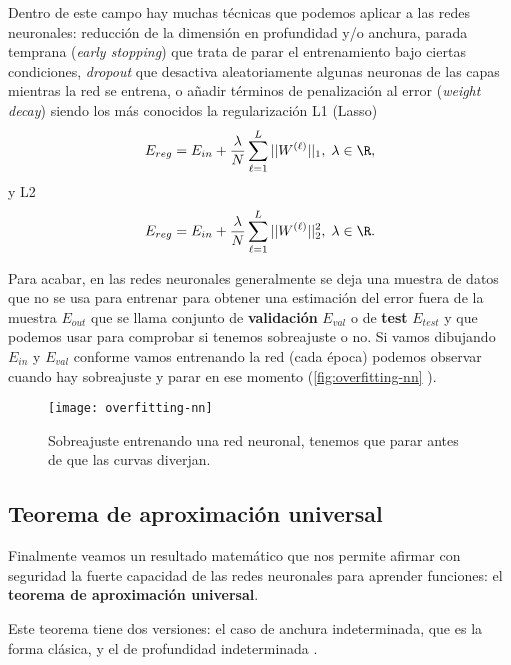 Dentro de este campo hay muchas técnicas que podemos aplicar a las redes neuronales: reducción de la dimensión en profundidad y/o anchura, parada temprana (\emph{early stopping}) que trata de parar el entrenamiento bajo ciertas condiciones, \emph{dropout} \cite{hertz2018introduction, hinton2012improving} que desactiva aleatoriamente algunas neuronas de las capas mientras la red se entrena, o añadir términos de penalización al error (\emph{weight decay}) siendo los más conocidos la regularización L1 (Lasso)
\begin{equation*}
  E_{reg} = E_{in} + \dfrac{\lambda}{N} \sum \limits^{L}_{\ell = 1} ||W^{(\ell)}||_1, \; \lambda \in \R,
  \label{eq:l1}
\end{equation*}
y L2 \cite{krogh1992simple}
\begin{equation*}
  E_{reg} = E_{in} + \dfrac{\lambda}{N} \sum \limits^{L}_{\ell = 1} ||W^{(\ell)}||_2^2, \; \lambda \in \R.
  \label{eq:l2}
\end{equation*}

Para acabar, en las redes neuronales generalmente se deja una muestra de datos que no se usa para entrenar para obtener una estimación del error fuera de la muestra $E_{out}$ que se llama conjunto de \textbf{validación} $E_{val}$ o de \textbf{test} $E_{test}$ y que podemos usar para comprobar si tenemos sobreajuste o no. Si vamos dibujando $E_{in}$ y $E_{val}$ conforme vamos entrenando la red (cada época) podemos observar cuando hay sobreajuste y parar en ese momento (\autoref{fig:overfitting-nn} \cite{julien2018overfitting}).

\begin{figure}[htpb]
  \centering
  \texttt{[image: overfitting-nn]}
  \caption{Sobreajuste entrenando una red neuronal, tenemos que parar antes de que las curvas diverjan.}
  \label{fig:overfitting-nn}
\end{figure}

\subsection{Teorema de aproximación universal}

Finalmente veamos un resultado matemático que nos permite afirmar con seguridad la fuerte capacidad de las redes neuronales para aprender funciones: el \textbf{teorema de aproximación universal}.

Este teorema tiene dos versiones: el caso de anchura indeterminada, que es la forma clásica, \cite{cybenko1989approximation} y el de profundidad indeterminada \cite{lu2017expressive}.


